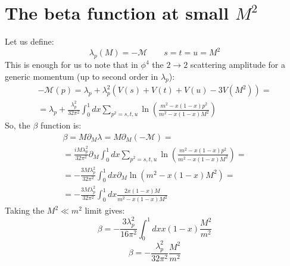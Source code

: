 \documentclass{article}
\begin{document}
\newpage
\section{The beta function at small $M^2$}
Let us define:
\begin{equation}
    \lambda_p(M) = -\mathcal{M}
    \qquad
    s = t = u = M^2
\end{equation}
This is enough for us to note that in $\phi^4$ the $2 \rightarrow 2$ scattering amplitude for a generic momentum (up to second order in $\lambda_p$):
\begin{equation}
\begin{gathered}
    -\mathcal{M}(p) = \lambda_p + \lambda_p^2\left(V(s) + V(t) + V(u) - 3V(M^2)\right) = \\ =
    \lambda_p + \frac{\lambda_p^2}{32\pi^2} \int_0^1 dx
        \sum_{p^2 = s, t, u}\ln\left(\frac{m^2 - x(1 - x)p^2}{m^2 - x(1 - x)M^2}\right)
\end{gathered}
\end{equation}
So, the $\beta$ function is:
\begin{equation}
\begin{gathered}
    \beta = M\partial_M \lambda = M\partial_M (-\mathcal{M}) = \\ =
    \frac{iM\lambda_p^2}{32\pi^2} \partial_M \int_0^1 dx
        \sum_{p^2 = s, t, u}\ln\left(\frac{m^2 - x(1 - x)p^2}{m^2 - x(1 - x)M^2}\right) = \\ =
    -\frac{3M\lambda_p^2}{32\pi^2} \int_0^1 dx \partial_M
        \ln\left(m^2 - x(1 - x)M^2\right) = \\ =
    -\frac{3M\lambda_p^2}{32\pi^2} \int_0^1 dx
        \frac{2x(1 - x)M}{m^2 - x(1 - x)M^2}
\end{gathered}
\end{equation}
Taking the $M^2 \ll m^2$ limit gives:
\begin{equation}
    \beta = -\frac{3\lambda_p^2}{16\pi^2} \int_0^1 dx
        x(1 - x)\frac{M^2}{m^2}
\end{equation}
\begin{equation}
    \beta = -\frac{\lambda_p^2}{32\pi^2}\frac{M^2}{m^2}
\end{equation}
\end{document}
